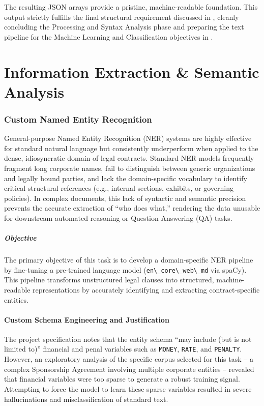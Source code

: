 \documentclass[twoside,final]{hcmut-report}
\newcommand{\result}[1]{\fcolorbox{red}{white}{#1}}
\begin{document}
\medskip

The resulting JSON arrays provide a pristine, machine-readable foundation. This output strictly fulfills the final structural requirement discussed in \result{Section~\ref{task_1.1}}, cleanly concluding the Processing and Syntax Analysis phase and preparing the text pipeline for the Machine Learning and Classification objectives in \result{Assignment~\ref{assignment_2}}.

\newpage\part{Information Extraction \& Semantic Analysis}
\label{assignment_2}
\section{Custom Named Entity Recognition}
\label{task_2.1}
General-purpose Named Entity Recognition (NER) systems are highly effective for standard natural language but consistently underperform when applied to the dense, idiosyncratic domain of legal contracts. Standard NER models frequently fragment long corporate names, fail to distinguish between generic organizations and legally bound parties, and lack the domain-specific vocabulary to identify critical structural references (e.g., internal sections, exhibits, or governing policies). In complex documents, this lack of syntactic and semantic precision prevents the accurate extraction of ``who does what,'' rendering the data unusable for downstream automated reasoning or Question Answering (QA) tasks.
\subsubsection*{Objective}
The primary objective of this task is to develop a domain-specific NER pipeline by fine-tuning a pre-trained language model (\verb|en\_core\_web\_md| via spaCy). This pipeline transforms unstructured legal clauses into structured, machine-readable representations by accurately identifying and extracting contract-specific entities.

\subsection{Custom Schema Engineering and Justification}
The project specification notes that the entity schema ``may include (but is not limited to)'' financial and penal variables such as \texttt{MONEY}, \texttt{RATE}, and \texttt{PENALTY}. However, an exploratory analysis of the specific corpus selected for this task -- a complex Sponsorship Agreement involving multiple corporate entities -- revealed that financial variables were too sparse to generate a robust training signal. Attempting to force the model to learn these sparse variables resulted in severe hallucinations and misclassification of standard text.
\end{document}

